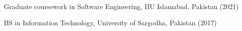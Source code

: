 \begin{zitemize}
\item Graduate coursework in Software Engineering, IIU Islamabad, Pakistan (2021)
\item BS in Information Technology, University of Sargodha, Pakistan (2017)
\end{zitemize}